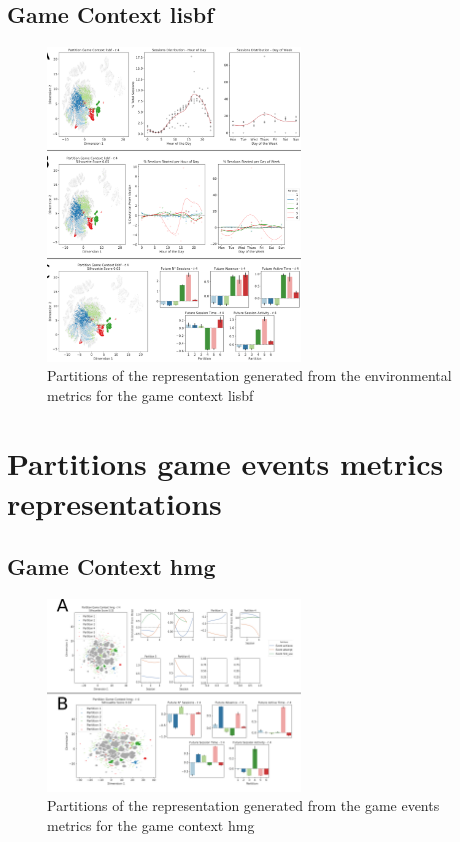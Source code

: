 \subsection{Game Context lisbf}
\label{env_clust_lisbf}

\begin{figure}[!htb]
\includegraphics[width=0.6\textwidth]{images/appendix_D/clust_env_lisbf.png}
\centering
\caption[\textbf{Partitions of the representation generated from the environmental metrics for the game context lisbf}]{Partitions of the representation generated from the environmental metrics for the game context lisbf}
\end{figure}
\FloatBarrier

\section{Partitions game events metrics representations}
\label{partitions_game_events}

\subsection{Game Context hmg}
\label{even_clust_hmg}

\begin{figure}[!htb]
\includegraphics[width=0.6\textwidth]{images/appendix_D/clust_even_hmg.png}
\centering
\caption[\textbf{Partitions of the representation generated from the game events metrics for the game context hmg}]{Partitions of the representation generated from the game events metrics for the game context hmg}
\end{figure}
\FloatBarrier

